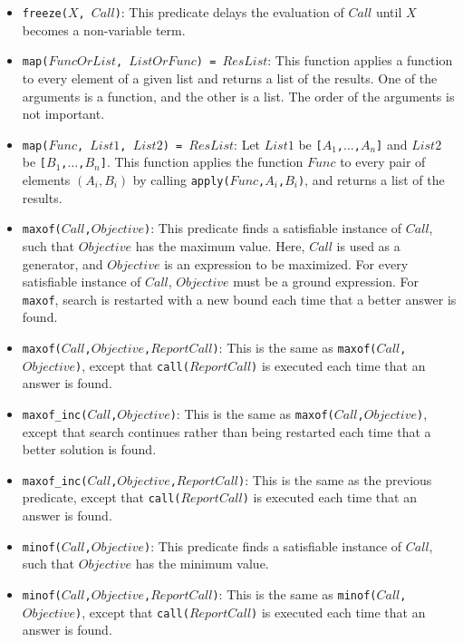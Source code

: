 \begin{itemize}
\item \texttt{freeze($X$, $Call$)}: This predicate delays the evaluation of $Call$ until $X$ becomes a non-variable term.
\item \texttt{map($FuncOrList$, $ListOrFunc$) = $ResList$}: This function applies a function to every element of a given list and returns a list of the results. One of the arguments is a function, and the other is a list. The order of the arguments is not important.
\item \texttt{map($Func$, $List1$, $List2$) = $ResList$}: Let $List1$ be \texttt{[$A_1$,$\ldots$,$A_n$]} and $List2$ be \texttt{[$B_1$,$\ldots$,$B_n$]}. This function applies the function $Func$ to every pair of elements $(A_i,B_i)$ by calling \texttt{apply($Func$,$A_i$,$B_i$)}, and returns a list of the results.
\item \texttt{maxof($Call$,$Objective$)}: This predicate finds a satisfiable instance of $Call$, such that $Objective$ has the maximum value. Here, $Call$ is used as a generator, and $Objective$ is an expression to be maximized. For every satisfiable instance of $Call$, $Objective$ must be a ground expression. For \texttt{maxof}, search is restarted with a new bound each time that a better answer is found.
\item \texttt{maxof($Call$,$Objective$,$ReportCall$)}: This is the same as \texttt{maxof($Call$,$Objective$)}, except that \texttt{call($ReportCall$)} is executed each time that an answer is found.
\item \texttt{maxof\_inc($Call$,$Objective$)}: This is the same as \texttt{maxof($Call$,$Objective$)}, except that search continues rather than being restarted each time that a better solution is found.
\item \texttt{maxof\_inc($Call$,$Objective$,$ReportCall$)}: This is the same as the previous predicate, except that \texttt{call($ReportCall$)} is executed each time that an answer is found.
\item \texttt{minof($Call$,$Objective$)}: This predicate finds a satisfiable instance of $Call$, such that $Objective$ has the minimum value. 
\item \texttt{minof($Call$,$Objective$,$ReportCall$)}: This is the same as \texttt{minof($Call$,$Objective$)}, except that \texttt{call($ReportCall$)} is executed each time that an answer is found.

\end{itemize}
